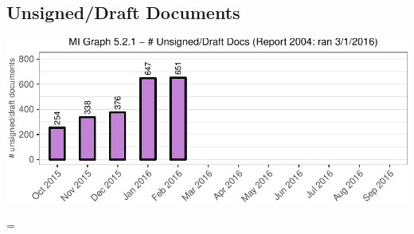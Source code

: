 \documentclass{article}\usepackage[]{graphicx}\usepackage[]{color}
\makeatletter
\def\maxwidth{ %
  \ifdim\Gin@nat@width>\linewidth
    \linewidth
  \else
    \Gin@nat@width
  \fi
}
\newenvironment{knitrout}{}{} %
\newenvironment{absolutelynopagebreak}
  {\par\nobreak\vfil\penalty0\vfilneg
   \vtop\bgroup}
  {\par\xdef\tpd{\the\prevdepth}\egroup
   \prevdepth=\tpd}
\makeatother
\begin{document}
\begin{absolutelynopagebreak}
\subsection{Unsigned/Draft Documents}
\begin{knitrout}
\color{fgcolor}
\includegraphics[width=\maxwidth]{figure/mi_p_unsign-1} 

\end{knitrout}
\end{absolutelynopagebreak}




\pagebreak
\end{document}
